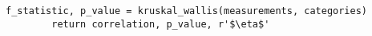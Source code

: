 \begin{lstlisting}[basicstyle=\tiny, style=py, caption={Compute Correlation Function}, label=lst:compute_correlation]
        f_statistic, p_value = kruskal_wallis(measurements, categories)
        return correlation, p_value, r'$\eta$'
\end{lstlisting}